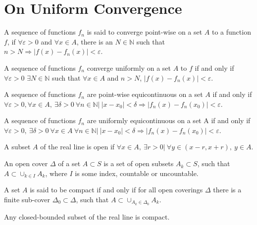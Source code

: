 \documentclass[crop=false,class=book]{standalone}
\begin{document}
\section{On Uniform Convergence}
\begin{definition}
A sequence of functions $f_n$ is said to converge point-wise on a set $A$ to a function $f$, if $\forall\varepsilon>0$ and $\forall x\in A$, there is an $N\in\mathbb{N}$ such that $n>N \Rightarrow |f(x)-f_n(x)|<\varepsilon$.
\end{definition}
\begin{definition}
A sequence of functions $f_n$ converge uniformly on a set $A$ to $f$ if and only if $\forall \varepsilon>0$ $\exists N\in\mathbb{N}$ such that $\forall x \in A$ and $n>N$, $|f(x) -f_n(x)|<\varepsilon$.
\end{definition}
\begin{definition}
A sequence of functions $f_n$ are point-wise equicontinuous on a set $A$ if and only if $\forall \varepsilon>0, \forall x \in A,\ \exists \delta>0\ \forall n\in\mathbb{N}|\ |x-x_0|<\delta \Rightarrow |f_n(x) - f_n(x_0)|<\varepsilon$.
\end{definition}
\begin{definition} A sequence of functions $f_n$ are uniformly equicontinuous on a set A if and only if $\forall\varepsilon>0,\ \exists \delta>0\ \forall x\in A\ \forall n\in\mathbb{N}|\ |x-x_0|<\delta \Rightarrow |f_n(x) - f_n(x_0)|<\varepsilon$.
\end{definition}
\begin{definition} A subset $A$ of the real line is open if $\forall x\in A,\ \exists r>0|\ \forall y \in (x-r,x+r),\ y\in A$.
\end{definition}
\begin{definition}
An open cover $\Delta$ of a set $A\subset S$ is a set of open subsets $A_k\subset S$, such that $A \subset \cup_{k\in I} A_k$, where $I$ is some index, countable or uncountable.
\end{definition}
\begin{definition}
A set $A$ is said to be compact if and only if for all open coverings $\Delta$ there is a finite sub-cover $\Delta_0\subset \Delta$, such that $A\subset \cup_{A_k \in \Delta_0} A_k$.
\end{definition}
\begin{theorem}
Any closed-bounded subset of the real line is compact. 
\end{theorem}
\end{document}
